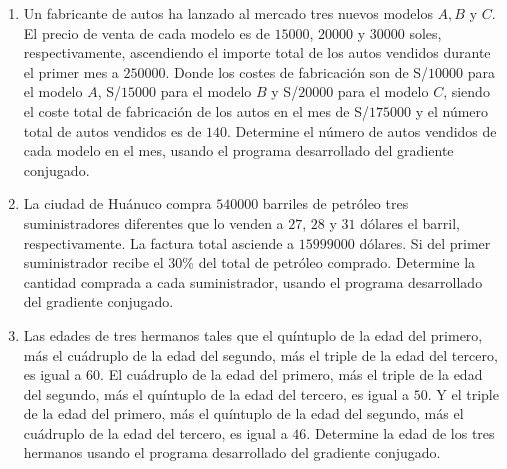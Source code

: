 \documentclass[
	spanish,
	8pt,
	utf8,
	xcolor=table,
	handout,
	aspectratio=169,
	professionalfonts,
	notheorems,
	mathserif,
]{beamer}
\newcounter{savedenum}
\newcommand*{\saveenum}{\setcounter{savedenum}{\theenumi}}
\begin{document}
\begin{frame}
\begin{enumerate}
		\item


		      Un fabricante de autos ha lanzado al mercado tres nuevos
		      modelos $A, B$ y $C$.
		      El precio de venta de cada modelo es de $15000$, $20000$ y
		      $30000$ soles, respectivamente, ascendiendo el importe
		      total de los autos vendidos durante el primer mes a
		      $250000$.
		      Donde los costes de fabricación son de S/$10000$ para el
		      modelo $A$, S/$15000$ para el modelo $B$ y S/$20000$ para
		      el modelo $C$, siendo el coste total de fabricación de los
		      autos en el mes de S/$175000$ y el número total de autos
		      vendidos es de $140$.
		      Determine el número de autos vendidos de cada modelo en el
		      mes, usando el programa desarrollado del gradiente conjugado.

		\item

		      La ciudad de Huánuco compra $540000$ barriles de petróleo
		      tres suministradores diferentes que lo venden a $27$, $28$
		      y $31$ dólares el barril, respectivamente.
		      La factura total asciende a $15999000$ dólares.
		      Si del primer suministrador recibe el $30$\% del total de
		      petróleo comprado.
		      Determine la cantidad comprada a cada suministrador, usando
		      el programa desarrollado del gradiente conjugado.

		\item

		      Las edades de tres hermanos tales que el quíntuplo de la
		      edad del primero, más el cuádruplo de la edad del segundo,
		      más el triple de la edad del tercero, es igual a $60$.
		      El cuádruplo de la edad del primero, más el triple de la
		      edad del segundo, más el quíntuplo de la edad del tercero,
		      es igual a $50$.
		      Y el triple de la edad del primero, más el quíntuplo de la
		      edad del segundo, más el cuádruplo de la edad del tercero,
		      es igual a $46$.
		      Determine la edad de los tres hermanos usando el programa
		      desarrollado del gradiente conjugado.

		      \saveenum
	\end{enumerate}
\end{frame}
\end{document}
